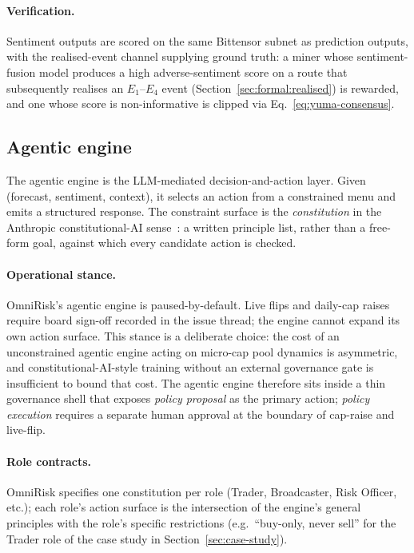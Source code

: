 \documentclass[11pt,a4paper]{article}
\begin{document}
\paragraph{Verification.} Sentiment outputs are scored on the same Bittensor subnet
as prediction outputs, with the realised-event channel supplying ground truth: a
miner whose sentiment-fusion model produces a high adverse-sentiment score on a
route that subsequently realises an $E_1$--$E_4$ event (Section~\ref{sec:formal:realised})
is rewarded, and one whose score is non-informative is clipped via
Eq.~\eqref{eq:yuma-consensus}.

\subsection{Agentic engine}\label{sec:engine:agentic}

The agentic engine is the LLM-mediated decision-and-action layer. Given (forecast,
sentiment, context), it selects an action from a constrained menu and emits a
structured response. The constraint surface is the \emph{constitution} in the
Anthropic constitutional-AI sense~\cite{bai2022constitutional}: a written principle
list, rather than a free-form goal, against which every candidate action is checked.

\paragraph{Operational stance.} OmniRisk's agentic engine is paused-by-default. Live
flips and daily-cap raises require board sign-off recorded in the issue thread; the
engine cannot expand its own action surface. This stance is a deliberate
choice: the cost of an unconstrained agentic engine acting on micro-cap pool
dynamics is asymmetric, and constitutional-AI-style training without an external
governance gate is insufficient to bound that cost. The agentic engine therefore
sits inside a thin governance shell that exposes \emph{policy proposal} as the
primary action; \emph{policy execution} requires a separate human approval at the
boundary of cap-raise and live-flip.

\paragraph{Role contracts.} OmniRisk specifies one constitution per role
(Trader, Broadcaster, Risk Officer, etc.); each role's action surface is the
intersection of the engine's general principles with the role's specific
restrictions (e.g.\ ``buy-only, never sell'' for the Trader role of the case study
in Section~\ref{sec:case-study}).
\end{document}
